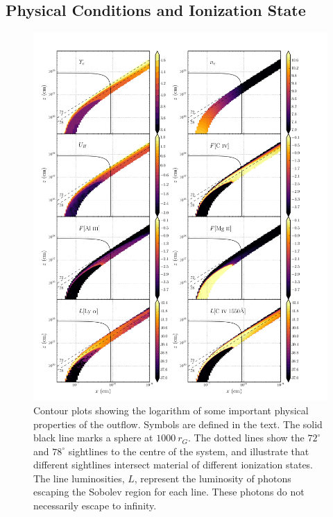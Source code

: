 \documentclass[useAMS,usenatbib]{mn2e_x}
\begin{document}
\subsection{Physical Conditions and Ionization State}


\begin{figure}
\centering
\includegraphics[width=1.0\textwidth]{figures/link8.png}
\caption
{
Contour plots showing the logarithm of some important 
physical properties of the outflow. Symbols are defined in the text.
The solid black line marks a sphere at $1000~r_G$.
The dotted lines show the $72^\circ$ and $78^\circ$ sightlines 
to the centre of the system, and illustrate that different sightlines
intersect material of different ionization states.
The line luminosities, $L$, represent the luminosity of photons
escaping the Sobolev region for each line. These photons do not
necessarily escape to infinity.
}
\label{fig:wind}
\end{figure}
\end{document}
